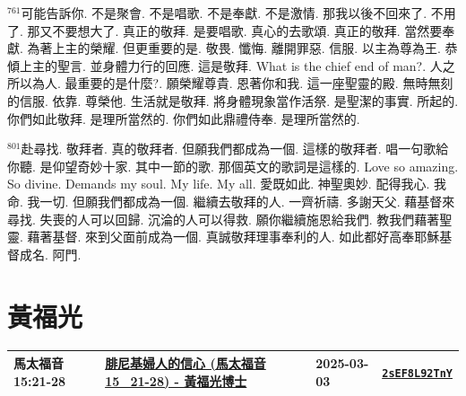 \documentclass{book}
\begin{document}
$^{761}$可能告訴你.
不是聚會.
不是唱歌.
不是奉獻.
不是激情.
那我以後不回來了.
不用了.
那又不要想大了.
真正的敬拜.
是要唱歌.
真心的去歌頌.
真正的敬拜.
當然要奉獻.
為著上主的榮耀.
但更重要的是.
敬畏.
懺悔.
離開罪惡.
信服.
以主為尊為王.
恭傾上主的聖言.
並身體力行的回應.
這是敬拜.
What is the chief end of man?.
人之所以為人.
最重要的是什麼?.
願榮耀尊貴.
恩著你和我.
這一座聖靈的殿.
無時無刻的信服.
依靠.
尊榮他.
生活就是敬拜.
將身體現象當作活祭.
是聖潔的事實.
所起的.
你們如此敬拜.
是理所當然的.
你們如此鼎禮侍奉.
是理所當然的.

$^{801}$赴尋找.
敬拜者.
真的敬拜者.
但願我們都成為一個.
這樣的敬拜者.
唱一句歌給你聽.
是仰望奇妙十家.
其中一節的歌.
那個英文的歌詞是這樣的.
Love so amazing.
So divine.
Demands my soul.
My life.
My all.
愛既如此.
神聖奧妙.
配得我心.
我命.
我一切.
但願我們都成為一個.
繼續去敬拜的人.
一齊祈禱.
多謝天父.
藉基督來尋找.
失喪的人可以回歸.
沉淪的人可以得救.
願你繼續施恩給我們.
教我們藉著聖靈.
藉著基督.
來到父面前成為一個.
真誠敬拜理事奉利的人.
如此都好高奉耶穌基督成名.
阿門.
\newpage



\chapter{黃福光}\label{ch:preacher15}
\begin{multicols}{3}
\minitoc
\end{multicols}
{ \scriptsize


\begin{xltabular}{\textwidth}{|p{0.15\textwidth} p{0.6\textwidth}|p{0.07\textwidth} p{0.1\textwidth}|}
\hline
馬太福音 15:21-28 & \hyperref[sec:2sEF8L92TnY]{腓尼基婦人的信心 (馬太福音15\_21-28) - 黃福光博士} & 2025-03-03 & \href{https://youtube.com/watch?v=2sEF8L92TnY}{\texttt{2sEF8L92TnY}} \\
\hline
\end{xltabular}
}
\newpage
\end{document}
